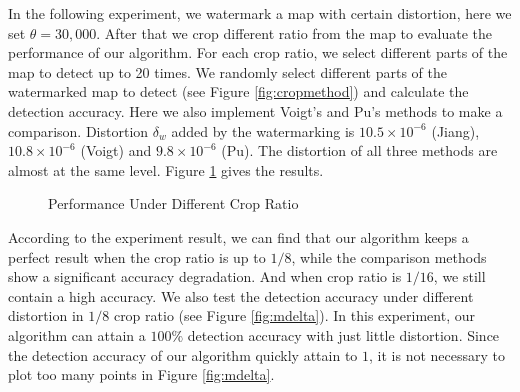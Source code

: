
In the following experiment, we watermark a map with certain distortion, here we set 
$\theta =30,000$. After that we crop different ratio from the map to evaluate the performance 
of our algorithm. For each crop ratio, we select different parts of the map to detect 
up to 20 times. We randomly select different parts of the watermarked map to detect (see 
Figure \ref{fig:cropmethod}) and calculate the detection accuracy. Here we also implement 
Voigt's and Pu's methods to make a comparison. Distortion $\delta_w$ added by the watermarking 
is $10.5\times 10^{ -6 }$ (Jiang), $10.8\times 10^{-6}$ (Voigt) and $9.8\times 10^{-6}$ (Pu). 
The distortion of all three methods are almost at the same level.
Figure \ref{fig:cropattack} gives the results.


\begin{figure}[th]
\centering
{}
\caption{Performance Under Different Crop Ratio}
\label{fig:cropattack}
\end{figure}

According to the experiment result, we can find that our algorithm keeps a perfect
result when the crop ratio is up to $1/8$, while the comparison methods show a significant
accuracy degradation. And when crop ratio is $1/16$, we still contain a high accuracy.
We also test the detection accuracy under different distortion in $1/8$ crop ratio
(see Figure \ref{fig:mdelta}). In this experiment, our algorithm can attain
a $100\%$ detection accuracy with just little distortion. Since the detection accuracy of 
our algorithm quickly attain to $1$, it is not necessary to plot too many points in Figure 
\ref{fig:mdelta}.

